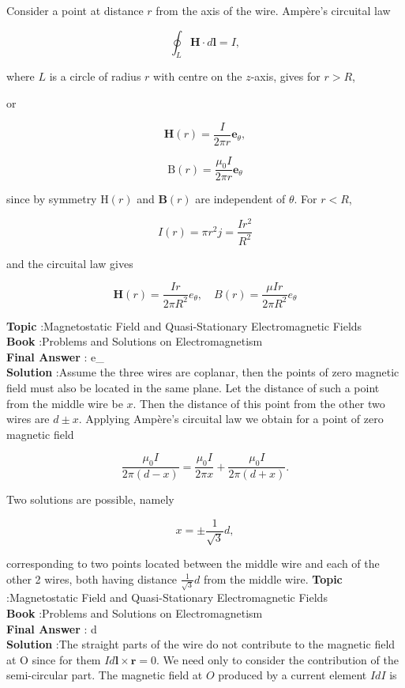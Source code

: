 \documentclass[10pt]{article}
\begin{document}
Consider a point at distance $r$ from the axis of the wire. Ampère's circuital law

$$
\oint_{L} \mathbf{H} \cdot d \mathbf{l}=I,
$$

where $L$ is a circle of radius $r$ with centre on the $z$-axis, gives for $r>R$,

or

$$
\mathbf{H}(r)=\frac{I}{2 \pi r} \mathbf{e}_{\theta},
$$

$$
\mathrm{B}(r)=\frac{\mu_{0} I}{2 \pi r} \mathbf{e}_{\theta}
$$

since by symmetry $\mathrm{H}(r)$ and $\mathbf{B}(r)$ are independent of $\theta$. For $r<R$,

$$
I(r)=\pi r^{2} j=\frac{I r^{2}}{R^{2}}
$$

and the circuital law gives

$$
\mathbf{H}(r)=\frac{I r}{2 \pi R^{2}} e_{\theta}, \quad B(r)=\frac{\mu I r}{2 \pi R^{2}} e_{\theta}
$$

\textbf{Topic} :Magnetostatic Field and Quasi-Stationary Electromagnetic Fields\\
\textbf{Book} :Problems and Solutions on Electromagnetism\\
\textbf{Final Answer} : e_{\theta}\\


\textbf{Solution} :Assume the three wires are coplanar, then the points of zero magnetic field must also be located in the same plane. Let the distance of such a point from the middle wire be $x$. Then the distance of this point from the other two wires are $d \pm x$. Applying Ampère's circuital law we obtain for a point of zero magnetic field

$$
\frac{\mu_{0} I}{2 \pi(d-x)}=\frac{\mu_{0} I}{2 \pi x}+\frac{\mu_{0} I}{2 \pi(d+x)} .
$$

Two solutions are possible, namely

$$
x=\pm \frac{1}{\sqrt{3}} d,
$$

corresponding to two points located between the middle wire and each of the other 2 wires, both having distance $\frac{1}{\sqrt{3}} d$ from the middle wire.
\textbf{Topic} :Magnetostatic Field and Quasi-Stationary Electromagnetic Fields\\
\textbf{Book} :Problems and Solutions on Electromagnetism\\
\textbf{Final Answer} :\pm {} d\\


\textbf{Solution} :The straight parts of the wire do not contribute to the magnetic field at $\mathrm{O}$ since for them $I d \mathbf{l} \times \mathbf{r}=0$. We need only to consider the contribution of the semi-circular part. The magnetic field at $O$ produced by a current element $I d I$ is
\end{document}
